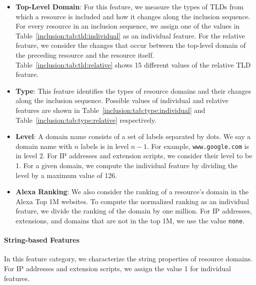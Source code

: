 \begin{itemize}

\item \textbf{Top-Level Domain}: For this feature, we measure the types of TLDs
from which a resource is included and how it changes along the inclusion
sequence. For every resource in an inclusion sequence, we assign one of the
values in Table~\ref{inclusion:tab:tld:individual} as an individual feature. For
the relative feature, we consider the changes that occur between the top-level
domain of the preceding resource and the resource itself.
Table~\ref{inclusion:tab:tld:relative} shows 15 different values of the relative
TLD feature.

\item \textbf{Type}: This feature identifies the types of resource domains and
their changes along the inclusion sequence. Possible values of individual and
relative features are shown in Table~\ref{inclusion:tab:type:individual} and
Table~\ref{inclusion:tab:type:relative} respectively.

\item \textbf{Level}: A domain name consists of a set of labels separated by
dots. We say a domain name with $n$ labels is in level $n-1$. For example,
\texttt{www.google.com} is in level 2. For IP addresses and extension scripts,
we consider their level to be 1. For a given domain, we compute the individual
feature by dividing the level by a maximum value of 126.

\item \textbf{Alexa Ranking}: We also consider the ranking of a resource's
domain in the Alexa Top 1M websites. To compute the normalized ranking as an
individual feature, we divide the ranking of the domain by one million. For IP
addresses, extensions, and domains that are not in the top 1M, we use the value
\texttt{none}.

\end{itemize}

\paragraph{String-based Features}

In this feature category, we characterize the string properties of resource
domains. For IP addresses and extension scripts, we assign the value 1 for
individual features.

